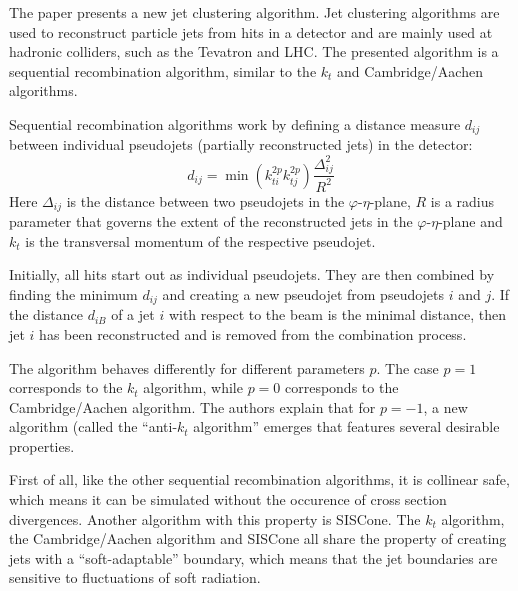 

\noindent
The paper\cite{antikt} presents a new jet clustering algorithm.
Jet clustering algorithms are used to reconstruct particle jets from hits in a detector and are mainly used at hadronic colliders, such as the Tevatron and LHC.
The presented algorithm is a sequential recombination algorithm, similar to the $k_t$ and Cambridge/Aachen algorithms.

Sequential recombination algorithms work by defining a distance measure $d_{ij}$ between individual pseudojets (partially reconstructed jets) in the detector:
\begin{equation}
  d_{ij} = \min\left(k_{ti}^{2p} k_{tj}^{2p}\right) \frac{Δ_{ij}^2}{R^2}
\end{equation}
Here $Δ_{ij}$ is the distance between two pseudojets in the $φ$-$η$-plane, $R$ is a radius parameter that governs the extent of the reconstructed jets in the $φ$-$η$-plane and $k_t$ is the transversal momentum of the respective pseudojet.

Initially, all hits start out as individual pseudojets.
They are then combined by finding the minimum $d_{ij}$ and creating a new pseudojet from pseudojets $i$ and $j$.
If the distance $d_{iB}$ of a jet $i$ with respect to the beam is the minimal distance, then jet $i$ has been reconstructed and is removed from the combination process.

The algorithm behaves differently for different parameters $p$.
The case $p=1$ corresponds to the $k_t$ algorithm, while $p=0$ corresponds to the Cambridge/Aachen algorithm.
The authors explain that for $p=-1$, a new algorithm (called the \enquote{anti-$k_t$ algorithm} emerges that features several desirable properties.

First of all, like the other sequential recombination algorithms, it is collinear safe, which means it can be simulated without the occurence of cross section divergences.
Another algorithm with this property is SISCone.
The $k_t$ algorithm, the Cambridge/Aachen algorithm and SISCone all share the property of creating jets with a \enquote{soft-adaptable} boundary, which means that the jet boundaries are sensitive to fluctuations of soft radiation.

